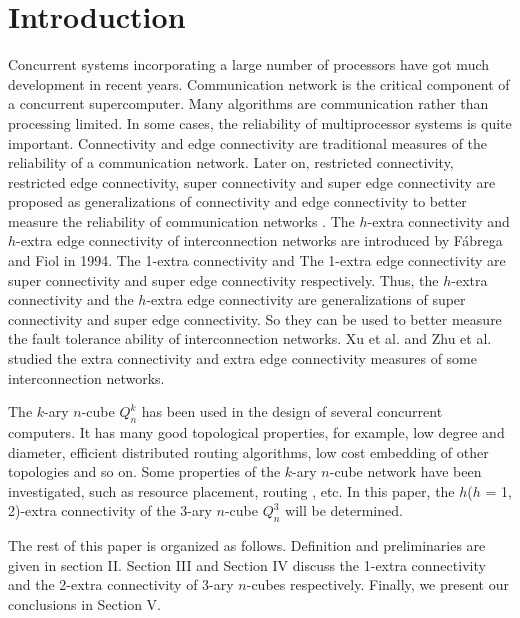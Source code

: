 \documentclass[preprint,number,12pt]{elsarticle}
\begin{document}
\section{Introduction}
Concurrent systems  incorporating a large number of processors
have got much development in recent years. Communication network is the critical component of a concurrent supercomputer. Many algorithms are communication rather than processing limited. In some cases,  the
reliability of multiprocessor systems is quite important. Connectivity and edge connectivity are traditional measures of the reliability of a communication network. Later on, restricted connectivity, restricted edge connectivity, super connectivity and super edge connectivity are proposed as generalizations of connectivity and edge connectivity to better measure the reliability of communication networks \cite{Boesch1986-p240-246, Esfahanian1989-p1586-1591, Esfahanian1988-p195-199, Wang2004-p199-205, Wang2008-p587-596, Chen2007-p1848-1855}. The $h$-extra connectivity and $h$-extra edge connectivity of interconnection networks are introduced by F\'abrega and Fiol \cite{F`abrega1994-p163-170} in 1994. The 1-extra connectivity and The 1-extra edge connectivity are super connectivity and super edge connectivity respectively.
Thus, the $h$-extra connectivity and the $h$-extra edge connectivity are generalizations of super connectivity and super edge connectivity. So they can be used to better measure the fault tolerance ability of interconnection networks.
Xu et al.\cite{Xu2007-p222-226} and Zhu et al.\cite{Zhu2006-p111-121} studied the extra connectivity and extra edge connectivity measures of some interconnection networks.

The $k$-ary $n$-cube $Q_{n}^{k}$ has been used in the design of several concurrent computers\cite{Esfahanian1989-p1586-1591, Roth1993-p35-35}.
It has many good topological properties, for example, low degree and diameter, efficient distributed routing algorithms, low cost embedding of other topologies and so on. Some properties of the $k$-ary $n$-cube network have been investigated, such as resource placement, routing \cite{Yoshinaga2004-p49-58}, etc. In this paper, the $h$($h$ = 1, 2)-extra connectivity of the 3-ary $n$-cube $Q_{n}^{3}$ will be determined.

The rest of this paper is organized as follows. Definition and preliminaries are given in section II. Section III and Section IV discuss the 1-extra connectivity and the 2-extra connectivity of 3-ary $n$-cubes respectively. Finally,  we present our conclusions in Section V.
\end{document}

